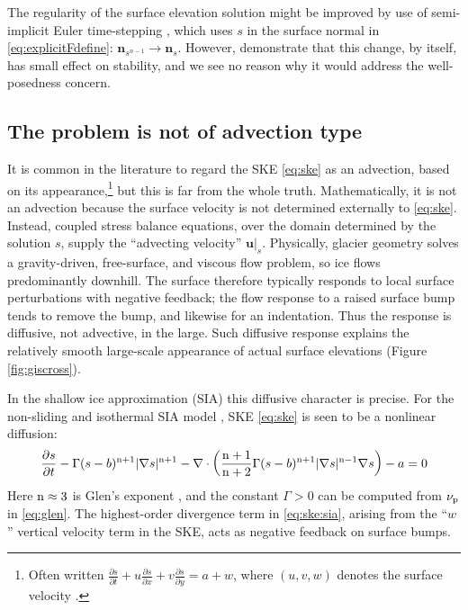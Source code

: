 \documentclass[hidelinks,onefignum,onetabnum,final]{siamart220329}  %
\newcommand{\grad}{\nabla}
\newcommand{\Div}{\nabla\cdot}
\newcommand{\bn}{\mathbf{n}}
\newcommand{\bu}{\mathbf{u}}
\newcommand{\nn}{{\text{\textnormal{n}}}}
\newcommand{\pp}{{\text{\textnormal{p}}}}
\begin{document}
The regularity of the surface elevation solution might be improved by use of semi-implicit Euler time-stepping  \cite{LofgrenAhlkronaHelanow2022}, which uses $s$ in the surface normal in \eqref{eq:explicitFdefine}: $\bn_{s^{n-1}} \to \bn_s$.  However, \cite{LofgrenAhlkronaHelanow2022} demonstrate that this change, by itself, has small effect on stability, and we see no reason why it would address the well-posedness concern.

\subsection{The problem is not of advection type} \label{subsec:notadv}  It is common in the literature to regard the SKE \eqref{eq:ske} as an advection, based on its appearance,\footnote{Often written $\frac{\partial s}{\partial t} + u \frac{\partial s}{\partial x} + v \frac{\partial s}{\partial y} = a + w$, where $(u,v,w)$ denotes the surface velocity \cite{GreveBlatter2009,SchoofHewitt2013}.} but this is far from the whole truth.  Mathematically, it is not an advection because the surface velocity is not determined externally to \eqref{eq:ske}.  Instead, coupled stress balance equations, over the domain determined by the solution $s$, supply the ``advecting velocity'' $\bu|_s$.  Physically, glacier geometry solves a gravity-driven, free-surface, and viscous flow problem, so ice flows predominantly downhill.  The surface therefore typically responds to local surface perturbations with negative feedback; the flow response to a raised surface bump tends to remove the bump, and likewise for an indentation.  Thus the response is diffusive, not advective, in the large.  Such diffusive response explains the relatively smooth large-scale appearance of actual surface elevations (Figure \ref{fig:giscross}).

In the shallow ice approximation (SIA) this diffusive character is precise.  For the non-sliding and isothermal SIA model \cite{GreveBlatter2009,JouvetBueler2012}, SKE \eqref{eq:ske} is seen to be a nonlinear diffusion:
\begin{equation}
\frac{\partial s}{\partial t} - \Gamma (s-b)^{\nn+1} |\grad s|^{\nn+1} - \Div \left(\frac{\nn+1}{\nn+2} \Gamma (s-b)^{\nn+1} |\grad s|^{\nn-1} \grad s\right) - a = 0  \label{eq:ske:sia}
\end{equation}
Here $\nn\approx 3$ is Glen's exponent \cite{GreveBlatter2009}, and the constant $\Gamma>0$ can be computed from $\nu_\pp$ in \eqref{eq:glen}.  The highest-order divergence term in \eqref{eq:ske:sia}, arising from the ``$w$'' vertical velocity term in the SKE, acts as negative feedback on surface bumps.
\end{document}
